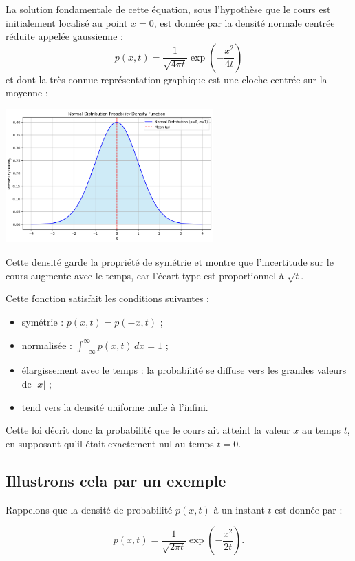 \documentclass[12pt,a4paper]{article}
\begin{document}
La solution fondamentale de cette équation, sous l’hypothèse que le cours est initialement localisé au point $x = 0$, est donnée par la densité normale centrée réduite appelée gaussienne :
\[
p(x,t) = \frac{1}{\sqrt{4\pi t}} \exp\left(-\frac{x^2}{4t}\right)
\]
et dont la très connue représentation graphique est une cloche centrée sur la moyenne :

\begin{center}
  \includegraphics[width=0.6\textwidth]{gaussian_curve.png}
\end{center}

Cette densité garde la propriété de symétrie et montre que l’incertitude sur le cours augmente avec le temps, car l’écart-type est proportionnel à \(\sqrt{t}\).

Cette fonction satisfait les conditions suivantes :
\begin{itemize}
    \item symétrie : $p(x,t) = p(-x,t)$ ;
    \item normalisée : $\int_{-\infty}^{\infty} p(x,t)\, dx = 1$ ;
    \item élargissement avec le temps : la probabilité se diffuse vers les grandes valeurs de $|x|$ ;
    \item tend vers la densité uniforme nulle à l’infini.
\end{itemize}

Cette loi décrit donc la probabilité que le cours ait atteint la valeur $x$ au temps $t$, en supposant qu’il était exactement nul au temps $t = 0$.

\subsection{Illustrons cela par un exemple}

Rappelons que la densité de probabilité \( p(x,t) \) à un instant \( t \) est donnée par :

\[
p(x,t) = \frac{1}{\sqrt{2\pi t}} \exp\left(-\frac{x^2}{2t}\right).
\]
\end{document}
